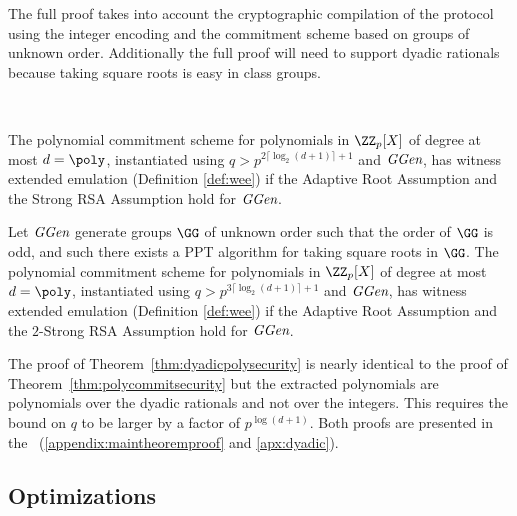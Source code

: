 The full proof takes into account the cryptographic compilation of the protocol using the integer encoding and the commitment scheme based on groups of unknown order. Additionally the full proof will need to support dyadic rationals because taking square roots is easy in class groups.






\newcommand{\maintheorem}{
The polynomial commitment scheme for polynomials in $\ZZ_p[X]$ of degree at most $d=\poly$, instantiated using $q>p^{2\lceil \log_2(d+1)\rceil+1}$ and $\ggen$, has witness extended emulation (Definition \ref{def:wee}) if the Adaptive Root Assumption and the Strong RSA Assumption hold for $\ggen$.
}
\begin{theorem}~\label{thm:polycommitsecurity} 
	\maintheorem
\end{theorem}


\newcommand{\dyadicmaintheorem}{
Let $\ggen$ generate groups $\GG$ of unknown order such that the order of $\GG$ is odd, and such there exists a PPT algorithm for taking square roots in $\GG$. The polynomial commitment scheme for polynomials in $\ZZ_p[X]$ of degree at most $d=\poly$, instantiated using $q>p^{3\lceil \log_2(d+1)\rceil +1}$ and $\ggen$, has witness extended emulation (Definition \ref{def:wee}) if the Adaptive Root Assumption and the  $2$-Strong RSA Assumption hold for $\ggen$.
}
\begin{theorem}
\label{thm:dyadicpolysecurity}	
\dyadicmaintheorem
\end{theorem}
The proof of Theorem~\ref{thm:dyadicpolysecurity} is nearly identical to the proof of Theorem~\ref{thm:polycommitsecurity} but the extracted polynomials are polynomials over the dyadic rationals and not over the integers. This requires the bound on $q$ to be larger by a factor of $p^{\log(d+1)}$. Both proofs are presented in the \appendixphrase~(\ref{appendix:maintheoremproof} and \ref{apx:dyadic}).


\subsection{Optimizations}
\label{subsec:optimization}

